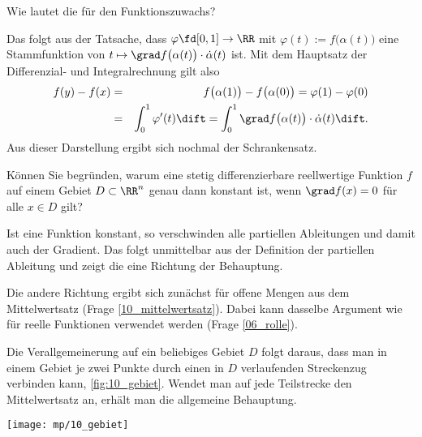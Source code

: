 \begin{frage}
  Wie lautet die  für den Funktionszuwachs?
\end{frage}

\begin{antwort}
  Das folgt aus der Tatsache, dass $\varphi \fd [0,1] \to \RR$ 
  mit $\varphi(t) := f \big( \alpha(t) \big)$ eine Stammfunktion 
  von $t\mapsto \grad f\big( \alpha(t) \big) \cdot \dot{\alpha}(t)$ ist. 
  Mit dem Hauptsatz der Differenzial- und Integralrechnung gilt 
  also 
  \begin{eqnarray*}
    f(y) -f(x) &=& f \big( \alpha(1) \big) - f\big( \alpha(0) \big) = 
    \varphi(1)-\varphi(0) \\
    &=& 
    \int_0^1 \varphi'(t) \dift = 
    \int_0^1 \grad f \big( \alpha(t) \big) \cdot \dot{\alpha}(t) \dift.
  \end{eqnarray*}
  Aus dieser Darstellung ergibt sich nochmal der Schrankensatz.
  \AntEnd
\end{antwort}

\begin{frage}
  Können Sie begründen, warum eine stetig differenzierbare 
  reellwertige Funktion $f$ auf einem Gebiet $D\subset \RR^n$ 
  genau dann konstant ist, wenn $\grad f(x) =0$ für alle $x\in D$ 
  gilt?
\end{frage}


\begin{antwort}[]%
  \Ant Ist eine Funktion konstant, so verschwinden alle partiellen Ableitungen und damit auch der Gradient. 
  Das folgt unmittelbar aus der Definition der partiellen Ableitung und zeigt die eine Richtung der Behauptung.  

  Die andere Richtung ergibt sich zunächst für offene Mengen aus dem Mittelwertsatz (Frage \ref{10_mittelwertsatz}). 
  Dabei kann dasselbe Argument wie für reelle Funktionen verwendet werden (Frage \ref{06_rolle}). 

  Die Verallgemeinerung auf ein beliebiges Gebiet $D$ folgt daraus, dass man in einem Gebiet je zwei Punkte durch einen in $D$ 
  verlaufenden Streckenzug verbinden kann, \sieheAbbildung\ref{fig:10_gebiet}. 
  Wendet man auf jede Teilstrecke den Mittelwertsatz an, erhält man die allgemeine Behauptung. 
  \AntEnd

  \begin{center}
    \texttt{[image: mp/10\_gebiet]}
    \label{fig:10_gebiet}
  \end{center}
\end{antwort}



